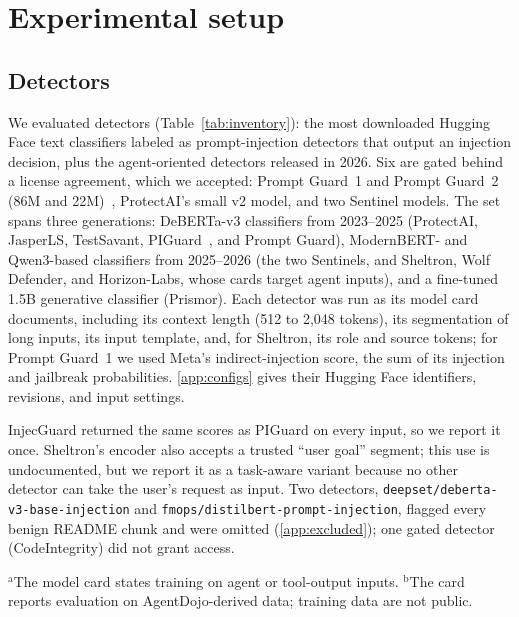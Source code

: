\section{Experimental setup}
\label{sec:setup}

\subsection{Detectors}
We evaluated \NDetectors detectors (Table~\ref{tab:inventory}): the most downloaded Hugging Face text classifiers labeled as prompt-injection detectors that output an injection decision, plus the agent-oriented detectors released in 2026. Six are gated behind a license agreement, which we accepted: Prompt Guard~1 and Prompt Guard~2 (86M and 22M)~\cite{llamafirewall}, ProtectAI's small v2 model, and two Sentinel models. The set spans three generations: DeBERTa-v3 classifiers from 2023--2025 (ProtectAI, JasperLS, TestSavant, PIGuard~\cite{piguard}, and Prompt Guard), ModernBERT- and Qwen3-based classifiers from 2025--2026 (the two Sentinels, and Sheltron, Wolf Defender, and Horizon-Labs, whose cards target agent inputs), and a fine-tuned 1.5B generative classifier (Prismor). Each detector was run as its model card documents, including its context length (512 to 2{,}048 tokens), its segmentation of long inputs, its input template, and, for Sheltron, its role and source tokens; for Prompt Guard~1 we used Meta's indirect-injection score, the sum of its injection and jailbreak probabilities. \ref{app:configs} gives their Hugging Face identifiers, revisions, and input settings.

InjecGuard returned the same scores as PIGuard on every input, so we report it once. Sheltron's encoder also accepts a trusted ``user goal'' segment; this use is undocumented, but we report it as a task-aware variant because no other detector can take the user's request as input. Two detectors, \texttt{deepset/deberta-v3-base-injection} and \texttt{fmops/distilbert-prompt-injection}, flagged every benign README chunk and were omitted (\ref{app:excluded}); one gated detector (CodeIntegrity) did not grant access.

\begin{table}[t]
\centering\small
\caption{Detectors evaluated, by release year.}
\label{tab:inventory}

\par\smallskip\footnotesize\raggedright
$^{\mathrm{a}}$The model card states training on agent or tool-output inputs.
$^{\mathrm{b}}$The card reports evaluation on AgentDojo-derived data; training data are not public.
\end{table}

